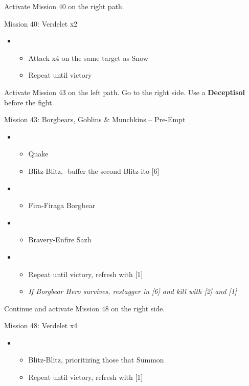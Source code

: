 Activate Mission 40 on the right path.

\begin{battle}{Mission 40: Verdelet x2}
	\begin{itemize}
		\item \second
			\begin{itemize}
				\item Attack x4 on the same target as Snow
				\item Repeat until victory
			\end{itemize}
	\end{itemize}
\end{battle}

Activate Mission 43 on the left path.
Go to the right side.
Use a \textbf{Deceptisol} before the fight.

\begin{battle}{{Mission 43: Borgbears, Goblins \& Munchkins -- Pre-Empt}}
	\begin{itemize}
		\item \second
			\begin{itemize}
				\item Quake
				\item Blitz-Blitz, \rav-buffer the second Blitz ito [6]
			\end{itemize}
		\item \sixth
			\begin{itemize}
				\item Fira-Firaga Borgbear
			\end{itemize}
		\item \third
			\begin{itemize}
				\item Bravery-Enfire Sazh
			\end{itemize}
		\item \second
			\begin{itemize}
				\item Repeat until victory, refresh with [1]
				\item \textit{If Borgbear Hero survives, restagger in [6] and kill with [2] and [1]}
			\end{itemize}
	\end{itemize}
\end{battle}

Continue and activate Mission 48 on the right side.

\begin{battle}{Mission 48: Verdelet x4}
	\begin{itemize}
		\item \second
			\begin{itemize}
				\item Blitz-Blitz, prioritizing those that Summon
				\item Repeat until victory, refresh with [1]
			\end{itemize}
	\end{itemize}
\end{battle}

